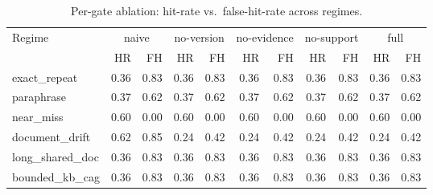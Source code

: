 \begin{table}[t]
\centering\small
\caption{Per-gate ablation: hit-rate vs.\ false-hit-rate across regimes.}
\label{tab:ablation}
\begin{tabular}{l rr rr rr rr rr }
\toprule
 Regime & \multicolumn{2}{c}{naive} & \multicolumn{2}{c}{no-version} & \multicolumn{2}{c}{no-evidence} & \multicolumn{2}{c}{no-support} & \multicolumn{2}{c}{full} \\
\cmidrule(lr){2-3}\cmidrule(lr){4-5}\cmidrule(lr){6-7}\cmidrule(lr){8-9}\cmidrule(lr){10-11}
 & HR & FH & HR & FH & HR & FH & HR & FH & HR & FH \\
\midrule
exact\_repeat & 0.36 & 0.83 & 0.36 & 0.83 & 0.36 & 0.83 & 0.36 & 0.83 & 0.36 & 0.83 \\
paraphrase & 0.37 & 0.62 & 0.37 & 0.62 & 0.37 & 0.62 & 0.37 & 0.62 & 0.37 & 0.62 \\
near\_miss & 0.60 & 0.00 & 0.60 & 0.00 & 0.60 & 0.00 & 0.60 & 0.00 & 0.60 & 0.00 \\
document\_drift & 0.62 & 0.85 & 0.24 & 0.42 & 0.24 & 0.42 & 0.24 & 0.42 & 0.24 & 0.42 \\
long\_shared\_doc & 0.36 & 0.83 & 0.36 & 0.83 & 0.36 & 0.83 & 0.36 & 0.83 & 0.36 & 0.83 \\
bounded\_kb\_cag & 0.36 & 0.83 & 0.36 & 0.83 & 0.36 & 0.83 & 0.36 & 0.83 & 0.36 & 0.83 \\
\bottomrule
\end{tabular}
\end{table}
